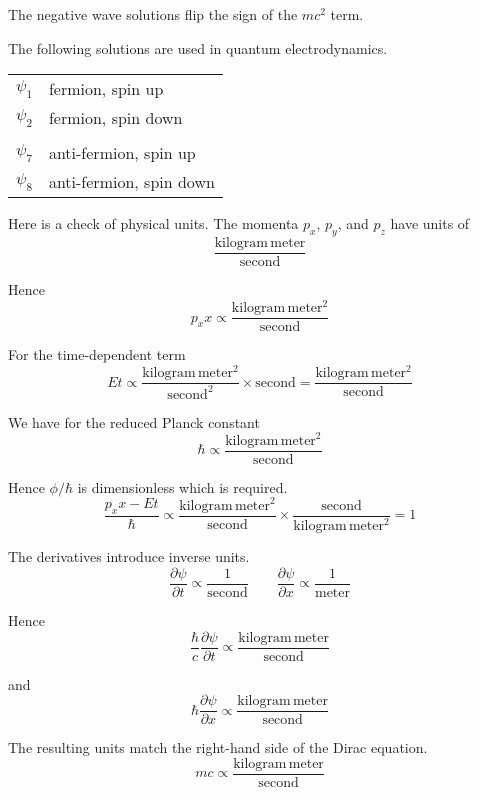 \documentclass[12pt]{article}
\begin{document}
\noindent
The negative wave solutions flip the sign of the $mc^2$ term.

\bigskip
\noindent
The following solutions are used in quantum electrodynamics.
\begin{center}
\begin{tabular}{ll}
$\psi_1$ & fermion, spin up\\
$\psi_2$ & fermion, spin down\\
\\
$\psi_7$ & anti-fermion, spin up\\
$\psi_8$ & anti-fermion, spin down
\end{tabular}
\end{center}

\noindent
Here is a check of physical units.
The momenta $p_x$, $p_y$, and $p_z$ have units of
\begin{equation*}
\frac{\text{kilogram}\,\text{meter}}{\text{second}}
\end{equation*}

\noindent
Hence
\begin{equation*}
p_xx\propto\frac{\text{kilogram}\,\text{meter}^2}{\text{second}}
\end{equation*}

\noindent
For the time-dependent term
\begin{equation*}
Et\propto\frac{\text{kilogram}\,\text{meter}^2}{\text{second}^2}\times\text{second}
=\frac{\text{kilogram}\,\text{meter}^2}{\text{second}}
\end{equation*}

\noindent
We have for the reduced Planck constant
\begin{equation*}
\hbar\propto\frac{\text{kilogram}\,\text{meter}^2}{\text{second}}
\end{equation*}

\noindent
Hence $\phi/\hbar$ is dimensionless which is required.
\begin{equation*}
\frac{p_xx-Et}{\hbar}\propto\frac{\text{kilogram}\,\text{meter}^2}{\text{second}}
\times\frac{\text{second}}{\text{kilogram}\,\text{meter}^2}=1
\end{equation*}

\noindent
The derivatives introduce inverse units.
\begin{equation*}
\frac{\partial\psi}{\partial t}\propto\frac{1}{\text{second}}
\qquad
\frac{\partial\psi}{\partial x}\propto\frac{1}{\text{meter}}
\end{equation*}

\noindent
Hence
\begin{equation*}
\frac{\hbar}{c}\frac{\partial\psi}{\partial t}
\propto\frac{\text{kilogram}\,\text{meter}}{\text{second}}
\end{equation*}

\noindent
and
\begin{equation*}
\hbar\frac{\partial\psi}{\partial x}\propto\frac{\text{kilogram}\,\text{meter}}{\text{second}}
\end{equation*}

\noindent
The resulting units match the right-hand side of the Dirac equation.
\begin{equation*}
mc\propto\frac{\text{kilogram}\,\text{meter}}{\text{second}}
\end{equation*}
\end{document}
